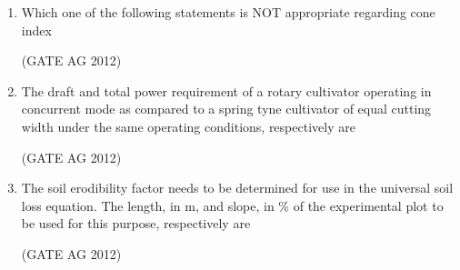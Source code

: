 \documentclass[journal]{IEEEtran}
\begin{document}
\begin{enumerate}
\medskip

\item
Which one of the following statements is NOT appropriate regarding cone index
\begin{enumerate}
\end{enumerate}
\hfill(GATE AG 2012)\\

\medskip

\item
The draft and total power requirement of a rotary cultivator operating in concurrent mode as compared to a spring tyne cultivator of equal cutting width under the same operating conditions, respectively are
\begin{enumerate}
\end{enumerate}
\hfill(GATE AG 2012)\\

\medskip

\item
The soil erodibility factor needs to be determined for use in the universal soil loss equation. The length, in m, and slope, in \% of the experimental plot to be used for this purpose, respectively are
\begin{enumerate}
\end{enumerate}
\hfill(GATE AG 2012)\\

\medskip


\end{enumerate}
\end{document}
